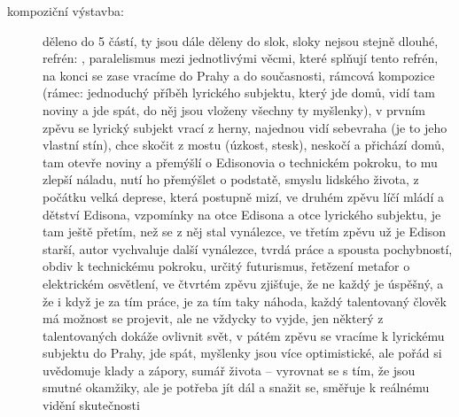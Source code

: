 \documentclass{article}
\begin{document}
\begin{description}
    \item[kompoziční výstavba:] děleno do 5 částí, ty jsou dále děleny do slok, sloky nejsou stejně dlouhé, refrén: , paralelismus mezi jednotlivými věcmi, které splňují tento refrén, na konci se zase vracíme do Prahy a do současnosti, rámcová kompozice (rámec: jednoduchý příběh lyrického subjektu, který jde domů, vidí tam noviny a jde spát, do něj jsou vloženy všechny ty myšlenky), v prvním zpěvu se lyrický subjekt vrací z herny, najednou vidí sebevraha (je to jeho vlastní stín), chce skočit z mostu (úzkost, stesk), neskočí a přichází domů, tam otevře noviny a přemýšlí o Edisonovia  o technickém pokroku, to mu zlepší náladu, nutí ho přemýšlet o podstatě, smyslu lidského života, z počátku velká deprese, která postupně mizí, ve druhém zpěvu líčí mládí a dětství Edisona, vzpomínky na otce Edisona a otce lyrického subjektu, je tam ještě přetím, než se z něj stal vynálezce, ve třetím zpěvu už je Edison starší, autor vychvaluje další vynálezce, tvrdá práce a spousta pochybností, obdiv k technickému pokroku, určitý futurismus, řetězení metafor o elektrickém osvětlení, ve čtvrtém zpěvu zjišťuje, že ne každý je úspěšný, a že i když je za tím práce, je za tím taky náhoda, každý talentovaný člověk má možnost se projevit, ale ne vždycky to vyjde, jen některý z talentovaných dokáže ovlivnit svět, v pátém zpěvu se vracíme k lyrickému subjektu do Prahy, jde spát, myšlenky jsou více optimistické, ale pořád si uvědomuje klady a zápory, sumář života -- vyrovnat se s tím, že jsou smutné okamžiky, ale je potřeba jít dál a snažit se, směřuje k reálnému vidění skutečnosti
\end{description}
\end{document}
